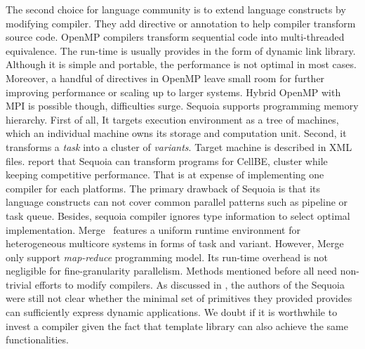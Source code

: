 The second choice for language community is to extend language constructs by
modifying compiler. They add directive or annotation to help compiler
transform source code. OpenMP compilers transform sequential code into
multi-threaded equivalence. The run-time is usually provides in the form of dynamic link library. Although it is simple and
portable, the performance is not optimal in most cases. Moreover, a
handful of directives in OpenMP leave small room for further improving
performance or scaling up to larger systems. Hybrid OpenMP with MPI is
possible though, difficulties surge. Sequoia supports
programming memory hierarchy. First of all, It targets execution
environment as a tree of machines, which an individual machine owns
its storage and computation unit. Second, it transforms a
\textit{task} into a
cluster of \emph{variants}. Target machine
is described in XML files. \cite{sequoia, sequoia-compiler} report  that Sequoia can transform programs
for CellBE, cluster while keeping competitive performance. That
is at expense of implementing one compiler for each platforms.
The primary drawback of Sequoia is that its language constructs can not cover common
parallel patterns such as pipeline or task queue. Besides, sequoia compiler
ignores type information to select optimal
implementation. Merge~\cite{merge} features a uniform runtime
environment for heterogeneous multicore 
systems in forms of task and variant. However, Merge only
support \emph{map-reduce} programming model. Its run-time overhead is not negligible for fine-granularity
parallelism. Methods mentioned before all need non-trivial efforts to
modify compilers. As discussed in \cite{sequoia}, the authors of the Sequoia were
still not clear whether the minimal set of primitives they provided provides can
sufficiently express dynamic applications. We doubt if it is worthwhile to
invest a compiler given the fact that template library can also
achieve the same functionalities.

